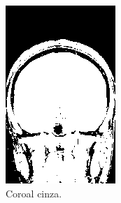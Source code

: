 \documentclass{article}
\begin{document}
\begin{figure}[H]
\begin{subfigure}[b]{0.3\textwidth}
        \includegraphics[width=\textwidth]{brain/neuroradiologist-coronal-gray.png}
        \caption{Coroal cinza.}
    \end{subfigure}
    ~
    \begin{subfigure}[b]{0.3\textwidth}

\end{subfigure}
\end{figure}
\end{document}
